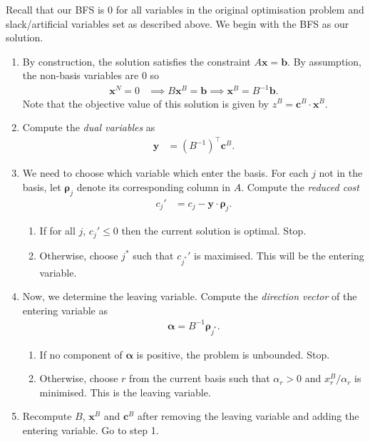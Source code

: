 \documentclass[11pt,a4paper]{article} %
\begin{document}
Recall that our BFS is $0$ for all variables in the 
original optimisation problem and slack/artificial variables set as described above.
We begin with the BFS as our solution. 
\begin{enumerate}
    \item By construction, the solution satisfies 
    the constraint $A\bm x = \bm b$. By assumption, 
    the non-basis variables are $0$ so 
    \begin{align*}
        \bm x^N = 0 &\implies B\bm x^B = \bm b \implies \bm x^B = B^{-1} \bm b.
    \end{align*} 
    Note that the objective value of this solution is given by $z^B = \bm c^B \cdot \bm x^B$.
    \item Compute the \textit{dual variables} as 
    \begin{align*}
        \bm y &= (B^{-1})^\top \bm c^B.
    \end{align*}
    \item We need to choose which variable which enter the basis. 
    For each $j$ not in the basis, let $\bm\rho_j$ denote its corresponding 
    column in $A$. Compute the \textit{reduced cost}
    \begin{align*}
        c_j' &= c_j - \bm y \cdot \bm\rho_j.
    \end{align*}
    \begin{enumerate}
        \item If for all $j$, $c_j' \le 0$ then the current solution is optimal. Stop.
        \item Otherwise, choose $j^*$ such that $c_{j^*}'$ is maximised. 
        This will be the entering variable.
    \end{enumerate}
    \item Now, we determine the leaving variable. Compute the \textit{direction vector}
    of the entering variable as 
    \begin{align*}
        \bm \alpha = B^{-1} \bm \rho_{j^*}.
    \end{align*}
    \begin{enumerate}
        \item If no component of $\bm \alpha$ is positive, the problem is unbounded. Stop.
        \item Otherwise, choose $r$ from the current basis such that $\alpha_r > 0$ 
        and $x^B_r / \alpha_r$ is minimised. This is the leaving variable.
    \end{enumerate}
    \item Recompute $B$, $\bm x^B$ and $\bm c^B$ after removing the leaving variable 
    and adding the entering variable. Go to step 1.

\end{enumerate}
\end{document}
